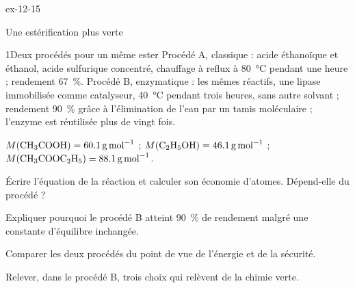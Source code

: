 \begin{blocLivre}{ex-12-15}
\begin{exercice}[3]{Une estérification plus verte}
\begin{docu}{1}{Deux procédés pour un même ester}
Procédé A, classique : acide éthanoïque et éthanol, acide sulfurique concentré, chauffage à reflux à 80~°C pendant
une heure ; rendement 67~\%. Procédé B, enzymatique : les mêmes réactifs, une lipase immobilisée comme catalyseur,
40~°C pendant trois heures, sans autre solvant ; rendement 90~\% grâce à l'élimination de l'eau par un tamis
moléculaire ; l'enzyme est réutilisée plus de vingt fois.
\end{docu}
\begin{donnees}
$M(\ce{CH3COOH})=\qty{60,1}{g.mol^{-1}}$ ; $M(\ce{C2H5OH})=\qty{46,1}{g.mol^{-1}}$ ;
$M(\ce{CH3COOC2H5})=\qty{88,1}{g.mol^{-1}}$.
\end{donnees}
\begin{questions}
\item Écrire l'équation de la réaction et calculer son économie d'atomes. Dépend-elle du procédé ?
\item Expliquer pourquoi le procédé B atteint 90~\% de rendement malgré une constante d'équilibre inchangée.
\item Comparer les deux procédés du point de vue de l'énergie et de la sécurité.
\item \initiative Relever, dans le procédé B, trois choix qui relèvent de la chimie verte.
\end{questions}
\end{exercice}
\end{blocLivre}
